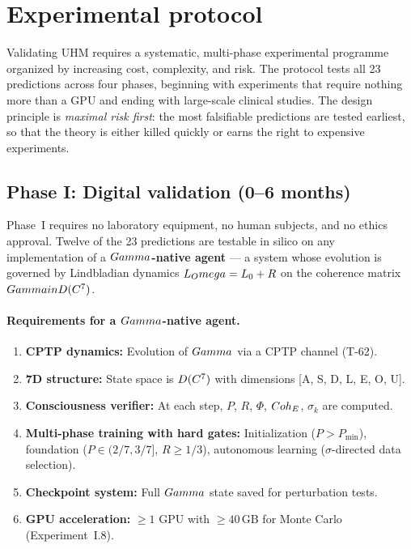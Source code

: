 
\section{Experimental protocol}
\label{sec:experimental}

Validating UHM requires a systematic, multi-phase experimental programme organized by
increasing cost, complexity, and risk. The protocol tests all 23 predictions across four
phases, beginning with experiments that require nothing more than a GPU and ending with
large-scale clinical studies. The design principle is \emph{maximal risk first}: the most
falsifiable predictions are tested earliest, so that the theory is either killed quickly
or earns the right to expensive experiments.

\subsection{Phase I: Digital validation (0--6 months)}
\label{subsec:phase1}

Phase~I requires no laboratory equipment, no human subjects, and no ethics approval.
Twelve of the 23 predictions are testable in silico on any implementation of a
\textbf{$Gamma$-native agent} --- a system whose evolution is governed by Lindbladian
dynamics $L_Omega = L_0 + R$ on the coherence matrix
$Gamma in D(C^7)$.

\paragraph{Requirements for a $Gamma$-native agent.}
\begin{enumerate}[leftmargin=2em,nosep]
  \item \textbf{CPTP dynamics:} Evolution of $Gamma$ via a CPTP channel (T-62).
  \item \textbf{7D structure:} State space is $D(C^7)$ with dimensions
        [A, S, D, L, E, O, U].
  \item \textbf{Consciousness verifier:} At each step, $P$, $R$, $\Phi$, $Coh_E$,
        $\sigma_k$ are computed.
  \item \textbf{Multi-phase training with hard gates:} Initialization ($P > P_{\min}$),
        foundation ($P \in (2/7, 3/7]$, $R \geq 1/3$), autonomous learning
        ($\sigma$-directed data selection).
  \item \textbf{Checkpoint system:} Full $Gamma$ state saved for perturbation tests.
  \item \textbf{GPU acceleration:} $\geq 1$ GPU with $\geq 40$\,GB for Monte Carlo
        (Experiment~I.8).
\end{enumerate}


